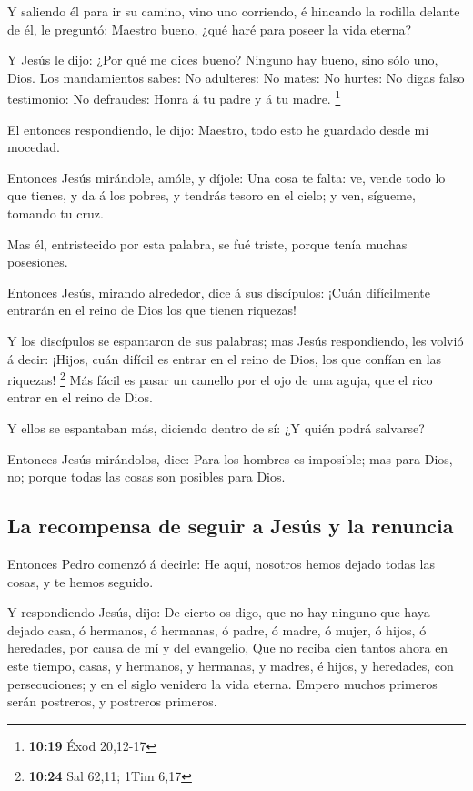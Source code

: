  Y saliendo él para ir su camino, vino uno corriendo, é
hincando la rodilla delante de él, le preguntó: Maestro bueno, ¿qué haré
para poseer la vida eterna?

 Y Jesús le dijo: ¿Por qué me dices bueno? Ninguno hay
bueno, sino sólo uno, Dios.  Los mandamientos sabes: No
adulteres: No mates: No hurtes: No digas falso testimonio: No defraudes:
Honra á tu padre y á tu madre. \footnote{\textbf{10:19} Éxod 20,12-17}

 El entonces respondiendo, le dijo: Maestro, todo esto he
guardado desde mi mocedad.

 Entonces Jesús mirándole, amóle, y díjole: Una cosa te
falta: ve, vende todo lo que tienes, y da á los pobres, y tendrás tesoro
en el cielo; y ven, sígueme, tomando tu cruz.

 Mas él, entristecido por esta palabra, se fué triste,
porque tenía muchas posesiones.

 Entonces Jesús, mirando alrededor, dice á sus
discípulos: ¡Cuán difícilmente entrarán en el reino de Dios los que
tienen riquezas!

 Y los discípulos se espantaron de sus palabras; mas
Jesús respondiendo, les volvió á decir: ¡Hijos, cuán difícil es entrar
en el reino de Dios, los que confían en las riquezas! \footnote{\textbf{10:24}
  Sal 62,11; 1Tim 6,17}  Más fácil es pasar un camello
por el ojo de una aguja, que el rico entrar en el reino de Dios.

 Y ellos se espantaban más, diciendo dentro de sí: ¿Y
quién podrá salvarse?

 Entonces Jesús mirándolos, dice: Para los hombres es
imposible; mas para Dios, no; porque todas las cosas son posibles para
Dios.

\hypertarget{la-recompensa-de-seguir-a-jesuxfas-y-la-renuncia}{%
\subsection{La recompensa de seguir a Jesús y la
renuncia}\label{la-recompensa-de-seguir-a-jesuxfas-y-la-renuncia}}

 Entonces Pedro comenzó á decirle: He aquí, nosotros
hemos dejado todas las cosas, y te hemos seguido.

 Y respondiendo Jesús, dijo: De cierto os digo, que no
hay ninguno que haya dejado casa, ó hermanos, ó hermanas, ó padre, ó
madre, ó mujer, ó hijos, ó heredades, por causa de mí y del evangelio,
 Que no reciba cien tantos ahora en este tiempo, casas, y
hermanos, y hermanas, y madres, é hijos, y heredades, con persecuciones;
y en el siglo venidero la vida eterna.  Empero muchos
primeros serán postreros, y postreros primeros.

